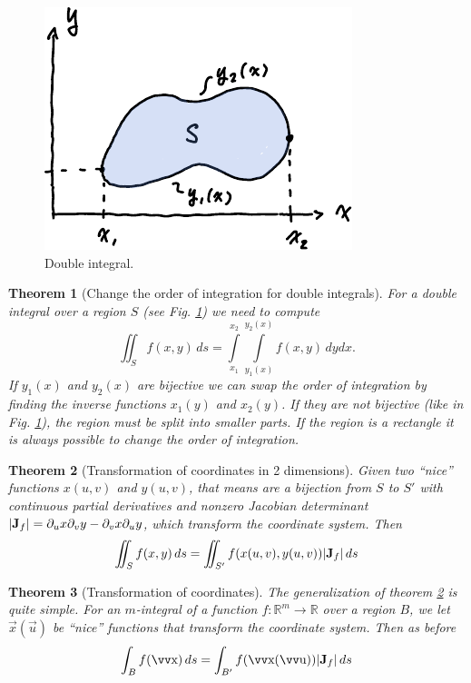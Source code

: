 \documentclass[twocolumn, margin=small]{tex/hsrzf}
\theoremstyle{fuvarzf}
\newtheorem{theorem}{Theorem}
\begin{document}
\begin{figure}
  \centering
  \includegraphics{img/double-integral}
  \caption{
    Double integral.
    \label{fig:double-integral}
  }
\end{figure}

\begin{theorem}[Change the order of integration for double integrals] For a
  double integral over a region \(S\) (see Fig.  \ref{fig:double-integral}) we
  need to compute
  \[
    \iint_S f(x,y) \,ds =
      \int\limits_{x_1}^{x_2} \int\limits_{y_1(x)}^{y_2(x)} f(x,y) \,dydx .
  \]
  If \(y_1(x)\) and \(y_2(x)\) are bijective we can swap the order of
  integration by finding the inverse functions \(x_1(y)\) and \(x_2(y)\). If
  they are not bijective (like in Fig. \ref{fig:double-integral}), the region
  must be split into smaller parts. If the region is a rectangle it is always
  possible to change the order of integration.
\end{theorem}

\begin{theorem}[Transformation of coordinates in 2 dimensions]
  \label{thm:transform-coords}
  Given two ``nice'' functions \(x(u,v)\) and \(y(u,v)\), that means are a
  bijection from \(S\) to \(S'\) with continuous partial derivatives and
  nonzero Jacobian determinant \(|\bm{\mathrm{J}}_f| = \partial_u x \partial_v y -
  \partial_v x \partial_u y\), which transform the coordinate system. Then
  \[
    \iint_S f(x,y) \,ds = \iint_{S'} f(x(u,v), y(u,v)) |\bm{\mathrm{J}}_f| \,ds
  \]
\end{theorem}

\begin{theorem}[Transformation of coordinates]
  The generalization of theorem \ref{thm:transform-coords} is quite simple.
  For an \(m\)-integral of a function \(f:\mathbb{R}^m\to\mathbb{R}\) over a
  region \(B\), we let \(\vec{x}(\vec{u})\) be ``nice'' functions that
  transform the coordinate system. Then as before
  \[
    \int_B f(\vec{x}) \,ds = \int_{B'} f(\vec{x}(\vec{u})) |\mx{J}_f| \,ds
  \]
\end{theorem}
\end{document}
